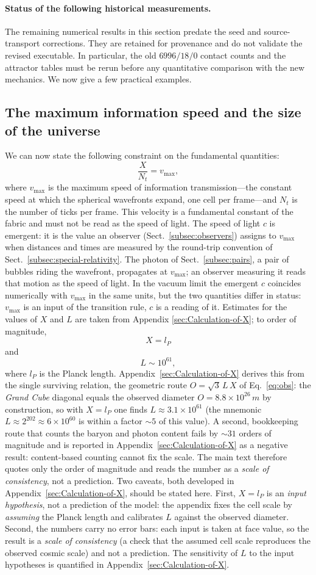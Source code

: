 \documentclass{ijuc}
\begin{document}
\paragraph{Status of the following historical measurements.} The remaining numerical results in this section predate the seed and source-transport corrections. They are retained for provenance and do not validate the revised executable. In particular, the old $6996/18/0$ contact counts and the attractor tables must be rerun before any quantitative comparison with the new mechanics.
We now give a few practical examples.
\subsection{The maximum information speed and the size of the universe}
We can now state the following constraint on the fundamental quantities:
\[
\frac{X}{N_t}=v_{\max},
\]
where $v_{\max}$ is the maximum speed of information transmission---the constant speed at which the spherical wavefronts expand, one cell per frame---and $N_t$ is the number of ticks per frame.
This velocity is a fundamental constant of the fabric and must not be read as the speed of light. The speed of light $c$ is emergent: it is the value an observer (Sect.~\ref{subsec:observers}) assigns to $v_{\max}$ when distances and times are measured by the round-trip convention of Sect.~\ref{subsec:special-relativity}. The photon of Sect.~\ref{subsec:pairs}, a pair of bubbles riding the wavefront, propagates at $v_{\max}$; an observer measuring it reads that motion as the speed of light. In the vacuum limit the emergent $c$ coincides numerically with $v_{\max}$ in the same units, but the two quantities differ in status: $v_{\max}$ is an input of the transition rule, $c$ is a reading of it.
Estimates for the values of $X$ and $L$ are taken from Appendix \ref{sec:Calculation-of-X}; to order of magnitude,
\[
X=l_{P}
\]
and
\[
L\sim10^{61},
\]
where $l_{P}$ is the Planck length.  Appendix~\ref{sec:Calculation-of-X} derives this from the single surviving relation, the geometric route $O=\sqrt{3}\,L\,X$ of Eq.~\eqref{eq:obs}: the \emph{Grand Cube} diagonal equals the observed diameter $O=8.8\times10^{26}\,m$ by construction, so with $X=l_{P}$ one finds $L\approx3.1\times10^{61}$ (the mnemonic $L\approx2^{202}\approx6\times10^{60}$ is within a factor $\sim5$ of this value).  A second, bookkeeping route that counts the baryon and photon content fails by $\sim31$ orders of magnitude and is reported in Appendix~\ref{sec:Calculation-of-X} as a negative result: content-based counting cannot fix the scale.  The main text therefore quotes only the order of magnitude and reads the number as a \emph{scale of consistency}, not a prediction.  Two caveats, both developed in Appendix~\ref{sec:Calculation-of-X}, should be stated here.  First, $X=l_{P}$ is an \emph{input hypothesis}, not a prediction of the model: the appendix fixes the cell scale by \emph{assuming} the Planck length and calibrates $L$ against the observed diameter.  Second, the numbers carry no error bars: each input is taken at face value, so the result is a \emph{scale of consistency} (a check that the assumed cell scale reproduces the observed cosmic scale) and not a prediction.  The sensitivity of $L$ to the input hypotheses is quantified in Appendix~\ref{sec:Calculation-of-X}.
\end{document}
